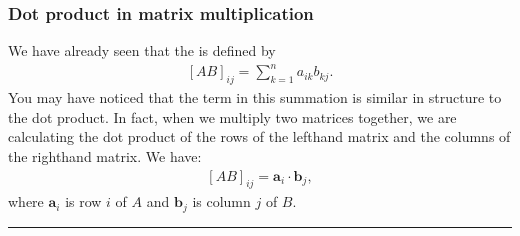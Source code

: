 \documentclass[letterpaper,10pt,english]{jupyterBook}
\begin{document}
\subsubsection{Dot product in matrix multiplication}
\label{\detokenize{_pages/3.3_Dot_and_cross_products:dot-product-in-matrix-multiplication}}
\sphinxAtStartPar
We have already seen that the {\hyperref[\detokenize{_pages/1.2_Matrix_multiplication:matrix-multiplication-definition}]{}} is defined by
\begin{equation*}
\begin{split} [AB]_{ij} = \sum_{k = 1}^n a_{ik}b_{kj}. \end{split}
\end{equation*}
\sphinxAtStartPar
You may have noticed that the term in this summation is similar in structure to the dot product. In fact, when we multiply two matrices together, we are calculating the dot product of the rows of the left\sphinxhyphen{}hand matrix and the columns of the right\sphinxhyphen{}hand matrix. We have:
\begin{equation*}
\begin{split} [AB]_{ij} = \mathbf{a}_i \cdot \mathbf{b}_j, \end{split}
\end{equation*}
\sphinxAtStartPar
where \(\mathbf{a}_i\) is row \(i\) of \(A\) and \(\mathbf{b}_j\) is column \(j\) of \(B\).


\bigskip\hrule\bigskip


\ignorespaces 
{}\ignorespaces 
\end{document}
